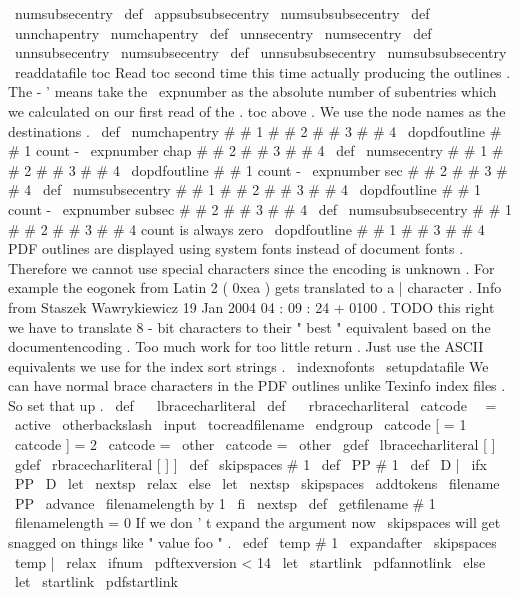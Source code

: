 {{{
\
numsubsecentry
}
%
\
def
\
appsubsubsecentry
{
\
numsubsubsecentry
}
%
\
def
\
unnchapentry
{
\
numchapentry
}
%
\
def
\
unnsecentry
{
\
numsecentry
}
%
\
def
\
unnsubsecentry
{
\
numsubsecentry
}
%
\
def
\
unnsubsubsecentry
{
\
numsubsubsecentry
}
%
\
readdatafile
{
toc
}
%
%
%
Read
toc
second
time
this
time
actually
producing
the
outlines
.
%
The
-
'
means
take
the
\
expnumber
as
the
absolute
number
of
%
subentries
which
we
calculated
on
our
first
read
of
the
.
toc
above
.
%
%
We
use
the
node
names
as
the
destinations
.
\
def
\
numchapentry
#
#
1
#
#
2
#
#
3
#
#
4
{
%
\
dopdfoutline
{
#
#
1
}
{
count
-
\
expnumber
{
chap
#
#
2
}
}
{
#
#
3
}
{
#
#
4
}
}
%
\
def
\
numsecentry
#
#
1
#
#
2
#
#
3
#
#
4
{
%
\
dopdfoutline
{
#
#
1
}
{
count
-
\
expnumber
{
sec
#
#
2
}
}
{
#
#
3
}
{
#
#
4
}
}
%
\
def
\
numsubsecentry
#
#
1
#
#
2
#
#
3
#
#
4
{
%
\
dopdfoutline
{
#
#
1
}
{
count
-
\
expnumber
{
subsec
#
#
2
}
}
{
#
#
3
}
{
#
#
4
}
}
%
\
def
\
numsubsubsecentry
#
#
1
#
#
2
#
#
3
#
#
4
{
%
count
is
always
zero
\
dopdfoutline
{
#
#
1
}
{
}
{
#
#
3
}
{
#
#
4
}
}
%
%
%
PDF
outlines
are
displayed
using
system
fonts
instead
of
%
document
fonts
.
Therefore
we
cannot
use
special
characters
%
since
the
encoding
is
unknown
.
For
example
the
eogonek
from
%
Latin
2
(
0xea
)
gets
translated
to
a
|
character
.
Info
from
%
Staszek
Wawrykiewicz
19
Jan
2004
04
:
09
:
24
+
0100
.
%
%
TODO
this
right
we
have
to
translate
8
-
bit
characters
to
%
their
"
best
"
equivalent
based
on
the
documentencoding
.
Too
%
much
work
for
too
little
return
.
Just
use
the
ASCII
equivalents
%
we
use
for
the
index
sort
strings
.
%
\
indexnofonts
\
setupdatafile
%
We
can
have
normal
brace
characters
in
the
PDF
outlines
unlike
%
Texinfo
index
files
.
So
set
that
up
.
\
def
\
{
{
\
lbracecharliteral
}
%
\
def
\
}
{
\
rbracecharliteral
}
%
\
catcode
\
\
=
\
active
\
otherbackslash
\
input
\
tocreadfilename
\
endgroup
}
{
\
catcode
[
=
1
\
catcode
]
=
2
\
catcode
{
=
\
other
\
catcode
}
=
\
other
\
gdef
\
lbracecharliteral
[
{
]
%
\
gdef
\
rbracecharliteral
[
}
]
%
]
%
\
def
\
skipspaces
#
1
{
\
def
\
PP
{
#
1
}
\
def
\
D
{
|
}
%
\
ifx
\
PP
\
D
\
let
\
nextsp
\
relax
\
else
\
let
\
nextsp
\
skipspaces
\
addtokens
{
\
filename
}
{
\
PP
}
%
\
advance
\
filenamelength
by
1
\
fi
\
nextsp
}
\
def
\
getfilename
#
1
{
%
\
filenamelength
=
0
%
If
we
don
'
t
expand
the
argument
now
\
skipspaces
will
get
%
snagged
on
things
like
"
value
{
foo
}
"
.
\
edef
\
temp
{
#
1
}
%
\
expandafter
\
skipspaces
\
temp
|
\
relax
}
\
ifnum
\
pdftexversion
<
14
\
let
\
startlink
\
pdfannotlink
\
else
\
let
\
startlink
\
pdfstartlink
}}
